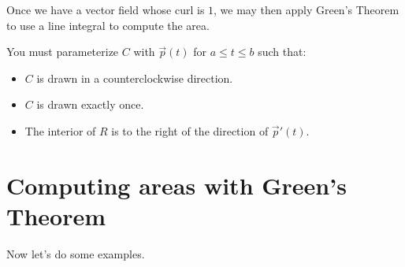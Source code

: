 \documentclass{ximera}
\begin{document}
Once we have a vector field whose curl is $1$, we may then apply
Green's Theorem to use a line integral to compute the area.

\begin{warning}
  You must parameterize $C$ with $\vec{p}(t)$ for $a\le t\le b$ such that:
  \begin{itemize}
    \item $C$ is drawn in a counterclockwise direction.
    \item $C$ is drawn exactly once.
    \item The interior of $R$ is to the right of the direction of
      $\vec{p}'(t)$.
  \end{itemize}
\end{warning}




\section{Computing areas with Green's Theorem}

Now let's do some examples.
\end{document}
